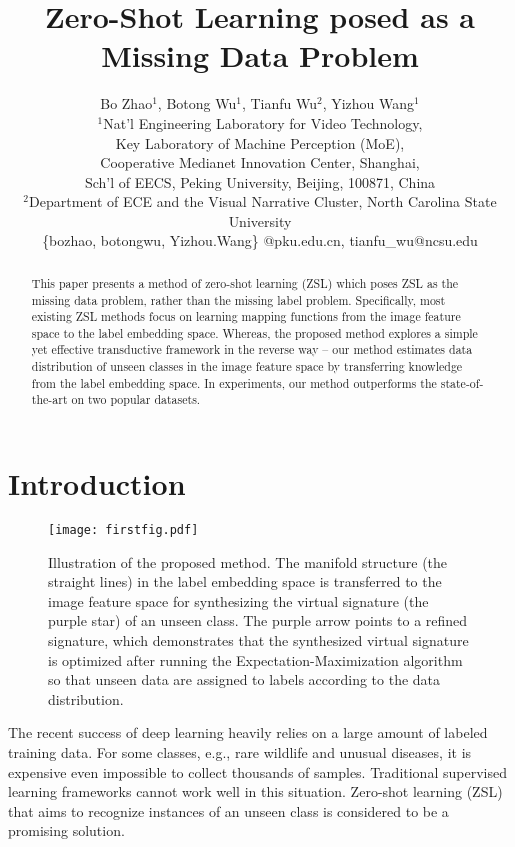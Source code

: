 \documentclass{article}
\title{Zero-Shot Learning posed as a Missing Data Problem}
\author{Bo Zhao$^{1}$, Botong Wu$^{1}$, Tianfu Wu$^{2}$, Yizhou Wang$^{1}$\\
\normalsize $^1$Nat'l Engineering Laboratory for Video Technology,\\
\normalsize Key Laboratory of Machine Perception (MoE),\\
\normalsize    Cooperative Medianet Innovation Center, Shanghai,\\
\normalsize	 Sch'l of EECS, Peking University, Beijing, 100871, China\\
\normalsize	$^2$Department of ECE and the Visual Narrative Cluster, North Carolina State University \\
{\small  \{bozhao, botongwu, Yizhou.Wang\} @pku.edu.cn, tianfu\_wu@ncsu.edu}
}
\begin{document}
\maketitle

\begin{abstract}
This paper presents a method of zero-shot learning (ZSL) which poses ZSL as the missing data problem, rather than the missing label problem.  Specifically, most existing ZSL methods focus on learning mapping functions from the image feature space to the label embedding space. Whereas, the proposed method explores a simple yet effective transductive framework in the reverse way \--- our method estimates data distribution of unseen classes in the image feature space  by transferring knowledge from the label embedding space. In experiments, our method outperforms the state-of-the-art on two popular datasets.
\end{abstract}

\section{Introduction}

\begin{figure}[h] %
  \centering
  \texttt{[image: firstfig.pdf]}
  \caption{Illustration of the proposed method. The manifold structure (the straight lines) in the label embedding space is transferred to the image feature space for synthesizing the virtual signature (the purple star) of an unseen class. The purple arrow points to a refined signature, which demonstrates that the synthesized virtual signature is optimized after running the Expectation-Maximization algorithm so that unseen data are assigned to labels according to the data distribution.}
  \label{fig:firstfig}
\end{figure}


The recent success of deep learning heavily relies on a large amount of labeled training data. For some classes, e.g., rare wildlife and unusual diseases, it is expensive even impossible to collect thousands of samples. Traditional supervised learning frameworks cannot work well in this situation. Zero-shot learning (ZSL) that aims to recognize instances of an unseen class is considered to be a promising solution.
\end{document}
